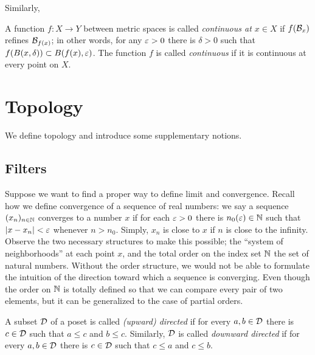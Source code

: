\documentclass{../crs}
\begin{document}

Similarly,

\begin{defn}
A function $f:X\to Y$ between metric spaces is called \emph{continuous at $x\in X$} if $f(\mathcal{B}_x)$ refines $\mathcal{B}_{f(x)}$; in other words, for any $\varepsilon>0$ there is $\delta>0$ such that $f(B(x,\delta))\subset B(f(x),\varepsilon)$.
The function $f$ is called \emph{continuous} if it is continuous at every point on $X$.
\end{defn}



















\section{Topology}
We define topology and introduce some supplementary notions.




\subsection{Filters}
Suppose we want to find a proper way to define limit and convergence.
Recall how we define convergence of a sequence of real numbers: we say a sequence $(x_n)_{n\in\mathbb{N}}$ converges to a number $x$ if for each $\varepsilon>0$ there is $n_0(\varepsilon)\in\mathbb{N}$ such that $|x-x_n|<\varepsilon$ whenever $n>n_0$.
Simply, $x_n$ is close to $x$ if $n$ is close to the infinity.
Observe the two necessary structures to make this possible; the ``system of neighborhoods'' at each point $x$, and the total order on the index set $\mathbb{N}$ the set of natural numbers.
Without the order structure, we would not be able to formulate the intuition of the direction toward which a sequence is converging.
Even though the order on $\mathbb{N}$ is totally defined so that we can compare every pair of two elements, but it can be generalized to the case of partial orders.

\begin{defn}
A subset $\mathcal{D}$ of a poset is called \emph{(upward) directed} if for every $a,b\in\mathcal{D}$ there is $c\in\mathcal{D}$ such that $a\le c$ and $b\le c$.
Similarly, $\mathcal{D}$ is called \emph{downward directed} if for every $a,b\in\mathcal{D}$ there is $c\in\mathcal{D}$ such that $c\le a$ and $c\le b$.
\end{defn}
\end{document}
